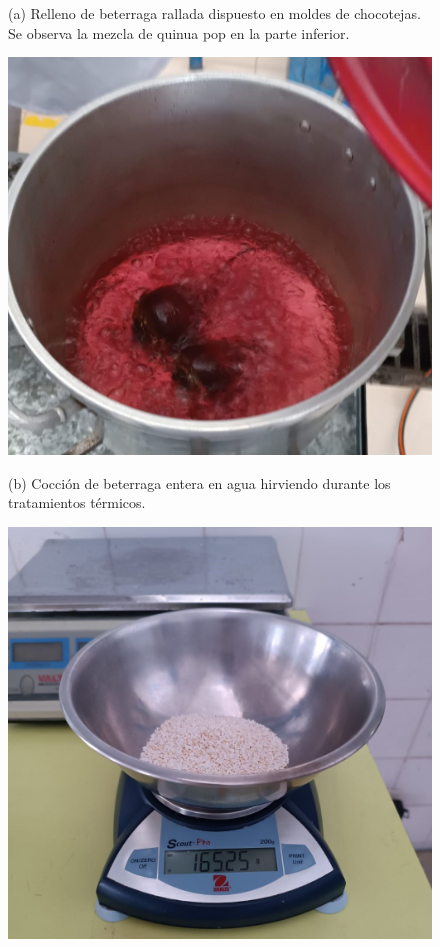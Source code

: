 \documentclass[manuscript,screen,review]{acmart}
\begin{document}
\begin{figure}[H]
\begin{minipage}{0.48\linewidth}
            \small (a) Relleno de beterraga rallada dispuesto en moldes de chocotejas. Se observa la mezcla de quinua pop en la parte inferior.
          \end{minipage}
          \hspace{1em}
          \begin{minipage}{0.48\linewidth}
            \centering
            \includegraphics[width=0.9\linewidth]{imagen/coc-beterraga.jpeg}
            
            \vspace{1mm}
            
            \small (b) Cocción de beterraga entera en agua hirviendo durante los tratamientos térmicos.
          \end{minipage}
          
          \vspace{1ex}
          
          \begin{minipage}{0.48\linewidth}
            \centering
            \includegraphics[width=0.9\linewidth]{imagen/kiwicha.jpeg}
            

\end{minipage}
\end{figure}
\end{document}
